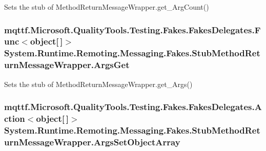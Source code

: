 Sets the stub of Method\-Return\-Message\-Wrapper.\-get\-\_\-\-Arg\-Count()

\hypertarget{class_system_1_1_runtime_1_1_remoting_1_1_messaging_1_1_fakes_1_1_stub_method_return_message_wrapper_a5e0d649cfffe99ff8448b967186b6925}{
\subsubsection[{Args\-Get}]{\setlength{\rightskip}{0pt plus 5cm}mqttf.\-Microsoft.\-Quality\-Tools.\-Testing.\-Fakes.\-Fakes\-Delegates.\-Func$<$object\mbox{[}$\,$\mbox{]}$>$ System.\-Runtime.\-Remoting.\-Messaging.\-Fakes.\-Stub\-Method\-Return\-Message\-Wrapper.\-Args\-Get}}\label{class_system_1_1_runtime_1_1_remoting_1_1_messaging_1_1_fakes_1_1_stub_method_return_message_wrapper_a5e0d649cfffe99ff8448b967186b6925}


Sets the stub of Method\-Return\-Message\-Wrapper.\-get\-\_\-\-Args()

\hypertarget{class_system_1_1_runtime_1_1_remoting_1_1_messaging_1_1_fakes_1_1_stub_method_return_message_wrapper_a649ef5e4b3e2dfb783c72511d41dbc2f}{
\subsubsection[{Args\-Set\-Object\-Array}]{\setlength{\rightskip}{0pt plus 5cm}mqttf.\-Microsoft.\-Quality\-Tools.\-Testing.\-Fakes.\-Fakes\-Delegates.\-Action$<$object\mbox{[}$\,$\mbox{]}$>$ System.\-Runtime.\-Remoting.\-Messaging.\-Fakes.\-Stub\-Method\-Return\-Message\-Wrapper.\-Args\-Set\-Object\-Array}}\label{class_system_1_1_runtime_1_1_remoting_1_1_messaging_1_1_fakes_1_1_stub_method_return_message_wrapper_a649ef5e4b3e2dfb783c72511d41dbc2f}


